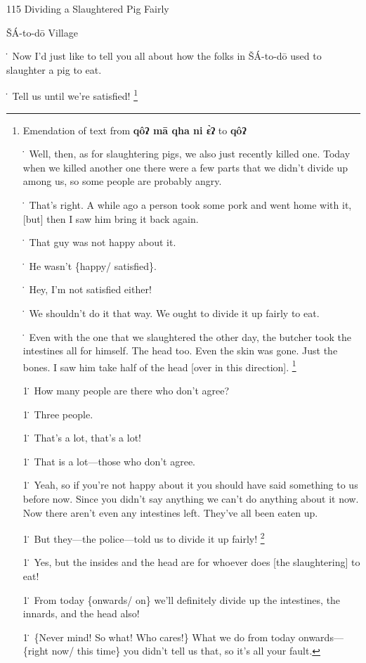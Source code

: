 
115 Dividing a Slaughtered Pig Fairly

ŠÁ-to-dō Village

\. Now I'd just like to tell you all about how the folks in ŠÁ-to-dō used to
slaughter a pig to eat.

\. Tell us until we're satisfied! \footnote{Emendation of text from \textbf{qôʔ mā qha ni ɛ̀ʔ} to \textbf{qôʔ}

\. Well, then, as for slaughtering pigs, we also just recently killed one. Today
when we killed another one there were a few parts that we didn't divide up among
us, so some people are probably angry.

\. That's right. A while ago a person took some pork and went home with it, [but]
then I saw him bring it back again.

\. That guy was not happy about it.

\. He wasn't \{happy/ satisfied\}.

\. Hey, I'm not satisfied either!

\. We shouldn't do it that way. We ought to divide it up fairly to eat.

\. Even with the one that we slaughtered the other day, the butcher took the intestines
all for himself. The head too. Even the skin was gone. Just the bones. I saw him
take half of the head [over in this direction]. \footnote{This parenthesized phrase is a wordy attempt to translate the verb-particle}

1\. How many people are there who don't agree?

1\. Three people.

1\. That's a lot, that's a lot!

1\. That is a lot---those who don't agree.

1\. Yeah, so if you're not happy about it you should have said something to us
before now. Since you didn't say anything we can't do anything about it now. Now
there aren't even any intestines left. They've all been eaten up.

1\. But they---the police---told us to divide it up fairly! \footnote{The pig in question was supposedly donated to the village by a local squad}

1\. Yes, but the insides and the head are for whoever does [the slaughtering] to
eat!

1\. From today \{onwards/ on\} we'll definitely divide up the intestines, the innards,
and the head also!

1\. \{Never mind! So what! Who cares!\} What we do from today onwards---\{right
now/ this time\} you didn't tell us that, so it's all your fault.

}
